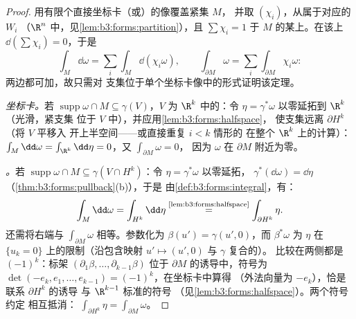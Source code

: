 \begin{proof}
用有限个直接坐标卡（或）的像覆盖紧集 $M$，
并取
$(\chi_i)$，从属于对应的 $W_i$
（$\R^n$ 中，见\cref{lem:b3:forms:partition}），且 $\sum\chi_i
= 1$ 于 $M$ 的某上。在该上
$\dd(\sum\chi_i) = 0$，于是
\[
\int_M\dd\omega = \sum_i\int_M\dd(\chi_i\omega),
\qquad
\int_{\partial M}\omega =
\sum_i\int_{\partial M}\chi_i\omega :
\]
两边都可加，故只需对
支集位于单个坐标卡像中的形式证明该定理。

\emph{坐标卡。}若 $\operatorname{supp}\omega \cap M
\subseteq \gamma(V)$，$V$ 为 $\R^k$ 中的：令 $\eta =
\gamma^*\omega$ 以零延拓到 $\R^k$（光滑，紧支集
位于 $V$ 中），并应用\cref{lem:b3:forms:halfspace}，
使支集远离 $\partial H^k$（将 $V$ 平移入
开上半空间——或直接重复 $i < k$ 情形的
在整个 $\R^k$ 上的计算）：$\int_M\dd\omega =
\int_{\R^k}\dd\eta = 0$，又 $\int_{\partial M}\omega = 0$，
因为 $\omega$ 在 $\partial M$ 附近为零。

\emph{。}若 $\operatorname{supp}\omega\cap M
\subseteq \gamma(V \cap H^k)$：令 $\eta = \gamma^*\omega$
以零延拓，
$\gamma^*(\dd\omega) = \dd\eta$
（\cref{thm:b3:forms:pullback}(b)），于是
由\cref{def:b3:forms:integral}，有：
\[
\int_M\dd\omega = \int_{H^k}\dd\eta
\overset{\text{\cref{lem:b3:forms:halfspace}}}{=}
\int_{\partial H^k}\eta .
\]
还需将右端与 $\int_{\partial
M}\omega$ 相等。参数化为 $\beta(u') =
\gamma(u', 0)$，而 $\beta^*\omega$ 为
$\eta$ 在 $\{u_k = 0\}$ 上的限制（沿包含映射 $u'
\mapsto (u', 0)$ 与 $\gamma$ 复合的）。
比较在两侧都是 $(-1)^k$：标架
$(\partial_1\beta, \dots, \partial_{k-1}\beta)$ 位于
$\partial M$ 的诱导中，符号为
$\det(-e_k, e_1, \dots, e_{k-1}) = (-1)^k$，在坐标卡中算得
（外法向量为 $-e_k$），恰是
联系 $\partial H^k$ 的诱导
与 $\R^{k-1}$ 标准的符号
（见\cref{lem:b3:forms:halfspace}）。两个符号约定
相互抵消：
$\int_{\partial H^k}\eta = \int_{\partial M}\omega$。
\end{proof}

